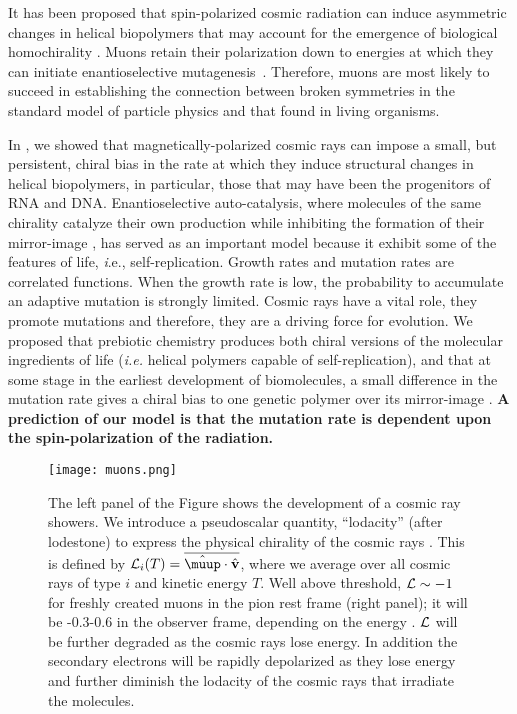 \documentclass[a4paper,11pt]{article}
\begin{document}
It has been proposed that spin-polarized cosmic radiation  can  induce asymmetric changes in helical biopolymers that may account for  the emergence of biological homochirality \cite{GB20}. Muons retain their polarization down to energies at which they can initiate enantioselective mutagenesis~\cite{GFB21}. Therefore, muons are  most likely to succeed in establishing the connection between broken symmetries in the standard model of particle physics  and that found in living organisms. 

 In \cite{GB20}, we showed that magnetically-polarized cosmic rays can impose a small, but persistent, chiral bias in the rate at which they induce structural changes in helical biopolymers, in particular, those that may have been the progenitors of RNA and DNA.  Enantioselective auto-catalysis, where molecules  of the same chirality  catalyze their own production while inhibiting the formation of their mirror-image \cite{frank1953}, has served as an important model because it exhibit some of the features of life, {\textit i.e.}, self-replication. Growth rates and mutation rates are correlated functions. When the growth rate is low, the probability to accumulate an adaptive mutation is strongly limited. 
Cosmic rays have a vital role, they promote mutations and therefore, they are  a driving force for evolution. We proposed that prebiotic chemistry produces both chiral versions of the molecular ingredients of life (\textit{i.e.} helical polymers capable of self-replication), and that at some stage in the earliest development of  biomolecules, a small difference in the mutation rate gives a chiral bias to one genetic polymer over its mirror-image \cite{GB20}.  {\bf A prediction of our model is that the mutation rate is dependent upon the spin-polarization of the radiation. }
 
  \begin{figure}
\centering
       \texttt{[image: muons.png]}
\caption{The left panel of the Figure shows the development of a cosmic ray showers. We introduce a pseudoscalar quantity, ``lodacity'' (after lodestone) to express the physical chirality of the cosmic rays \cite{GB20}. This is defined by $
{\cal L}_i(T)=\overline{\hat{\boldsymbol{\muup}}\cdot\hat{\textbf v}}$,
where we average over all cosmic rays of type $i$ and kinetic energy $T$.  Well above threshold, ${\cal L}\sim-1$ for freshly created muons in the pion rest frame (right panel); it will be -0.3-0.6 in the observer frame, depending on the energy  \cite{1993APh.....1..195L, GFB21}.  ${\cal L}$ will be further degraded as the cosmic rays lose energy. In addition the secondary electrons will be rapidly depolarized as they lose energy and further diminish the lodacity of the cosmic rays that irradiate the molecules.}
\label{fig:muons}
\end{figure}
\end{document}
